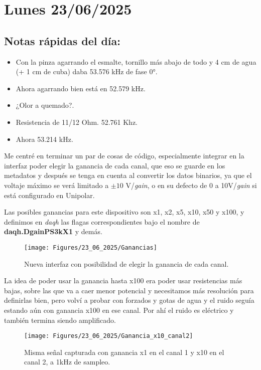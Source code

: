 \section{Lunes 23/06/2025}

\subsection*{Notas rápidas del día:}
\begin{itemize}
	\item Con la pinza agarrando el esmalte, tornillo más abajo de todo y 4 cm de agua (+ 1 cm de cuba) daba 53.576 kHz de fase 0°.
	\item Ahora agarrando bien está en 52.579 kHz.
	\item ¿Olor a quemado?. 
	
	\item Resistencia de 11/12 Ohm. 52.761 Khz.
	\item Ahora 53.214 kHz.
\end{itemize}

Me centré en terminar un par de cosas de código, especialmente integrar en la interfaz poder elegir la ganancia de cada canal, que eso se guarde en los metadatos y después se tenga en cuenta al convertir los datos binarios, ya que el voltaje máximo se verá limitado a $\pm10$ V/\textit{gain}, o en su defecto de 0 a 10V/\textit{gain} si está configurado en Unipolar.

Las posibles ganancias para este dispositivo son x1, x2, x5, x10, x50 y x100, y definimos en \textit{daqh} las flagas correspondientes bajo el nombre de \textbf{daqh.DgainPS3kX1} y demás.

\begin{figure}[th!]
	\centering
	\texttt{[image: Figures/23\_06\_2025/Ganancias]}
	\caption{Nueva interfaz con posibilidad de elegir la ganancia de cada canal.}
	\label{fig:ganancias}
\end{figure}



La idea de poder usar la ganancia hasta x100 era poder usar resistencias más bajas, sobre las que va a caer menor potencial y necesitamos más resolución para definirlas bien, pero volví a probar con forzados y gotas de agua y el ruido seguía estando aún con ganancia x100 en ese canal. Por ahí el ruido es eléctrico y también termina siendo amplificado.

\begin{figure}[th!]
	\centering
	\texttt{[image: Figures/23\_06\_2025/Ganancia\_x10\_canal2]}
	\caption{Misma señal capturada con ganancia x1 en el canal 1 y x10 en el canal 2, a 1kHz de sampleo.}
	\label{fig:gananciax10canal2}
\end{figure}


